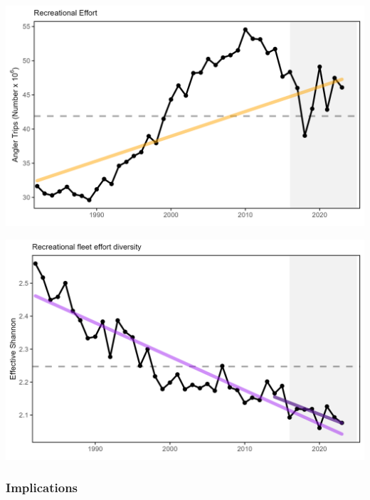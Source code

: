 \documentclass[
  10pt,
]{article}
\let\origfigure\figure
\let\endorigfigure\endfigure
\renewenvironment{figure}[1][2] {
    \expandafter\origfigure\expandafter[H]
} {
    \endorigfigure
}
\begin{document}
\begin{figure}

{\centering \includegraphics[width=6.5in]{images/MidAtlantic/rec_op_MidAtlantic_2025-09-05} 

}

\caption{Recreational effort (number of trips, black) in the Mid-Atlantic, with significant increase (orange line).}\label{fig:rec-op}
\end{figure}

\begin{figure}

{\centering \includegraphics[width=6.5in]{images/MidAtlantic/rec_div_MidAtlantic_2025-09-05} 

}

\caption{Recreational fleet effort diversity (black) in the Mid-Atlantic, with significant decrease (purple line).}\label{fig:rec-div}
\end{figure}

\subsubsection{Implications}\label{implications-2}
\end{document}
